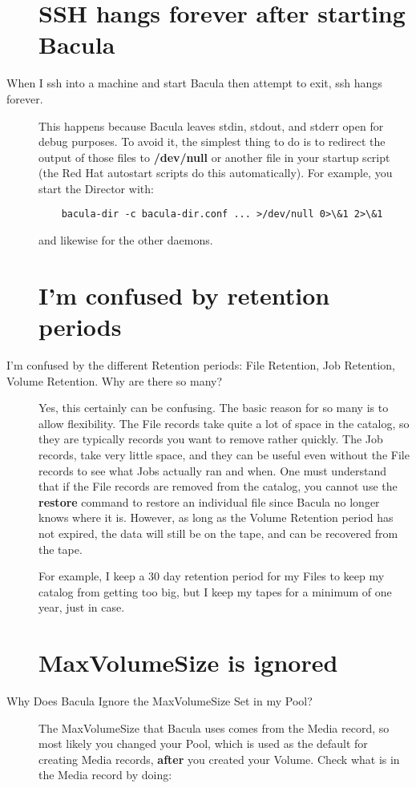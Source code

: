 \begin{description}
\label{sshHanging}
\section{SSH hangs forever after starting Bacula}
\item [When I ssh into a machine and start Bacula then attempt to exit,
   ssh hangs forever.]
   This happens because Bacula leaves stdin, stdout, and stderr open for
   debug purposes.  To avoid it, the simplest thing to do is to redirect
   the output of those files to {\bf /dev/null} or another file in your
   startup script (the Red Hat autostart scripts do this automatically).
   For example, you start the Director with:

\footnotesize
\begin{verbatim}
    bacula-dir -c bacula-dir.conf ... >/dev/null 0>\&1 2>\&1

\end{verbatim}
\normalsize

and likewise for the other daemons.

\label{RetentionPeriods}
\section{I'm confused by retention periods}
\item [I'm confused by the different Retention periods: File Retention,
   Job Retention, Volume Retention. Why are there so many?]
   Yes, this certainly can be confusing.  The basic reason for so many is
   to allow flexibility.  The File records take quite a lot of space in the
   catalog, so they are typically records you want to remove rather
   quickly.  The Job records, take very little space, and they can be
   useful even without the File records to see what Jobs actually ran and
   when.  One must understand that if the File records are removed from the
   catalog, you cannot use the {\bf restore} command to restore an
   individual file since Bacula no longer knows where it is.  However, as
   long as the Volume Retention period has not expired, the data will still
   be on the tape, and can be recovered from the tape.

   For example, I keep a 30 day retention period for my Files to keep my
   catalog from getting too big, but I keep my tapes for a minimum of one
   year, just in case.

\label{MaxVolumeSize}
\section{MaxVolumeSize is ignored}
\item [Why Does Bacula Ignore the MaxVolumeSize Set in my Pool?]
   The MaxVolumeSize that Bacula uses comes from the Media record, so most
   likely you changed your Pool, which is used as the default for creating
   Media records, {\bf after} you created your Volume.  Check what is in
   the Media record by doing:


\end{description}
